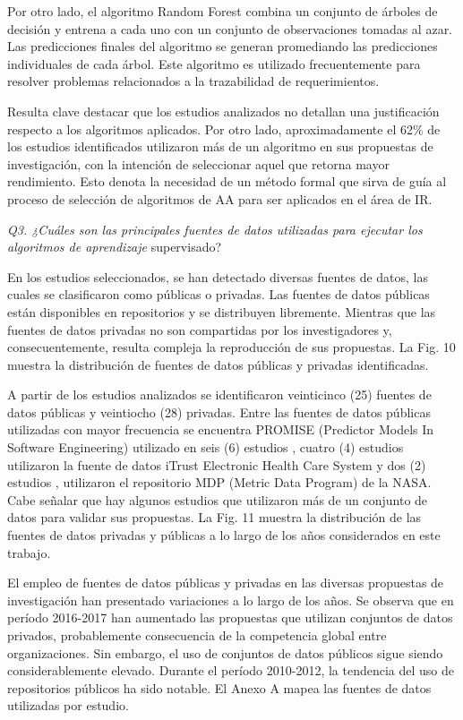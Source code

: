 \documentclass[journal]{IEEEtran}
\begin{document}
Por otro lado, el algoritmo Random Forest combina un conjunto de árboles de decisión y entrena a cada uno con un conjunto de observaciones tomadas al azar. Las predicciones finales del algoritmo se generan promediando las predicciones individuales de cada árbol. Este algoritmo es utilizado frecuentemente para resolver problemas relacionados a la trazabilidad de requerimientos. 

Resulta clave destacar que los estudios analizados no detallan una justificación respecto a los algoritmos aplicados. Por otro lado, aproximadamente el 62\% de los estudios identificados utilizaron más de un algoritmo en sus propuestas de investigación, con la intención de seleccionar aquel que retorna mayor rendimiento. Esto denota la necesidad de un método formal que sirva de guía al proceso de selección de algoritmos de AA para ser aplicados en el área de IR.

\emph{Q3. ¿Cuáles son las principales fuentes de datos utilizadas para ejecutar los algoritmos de aprendizaje} supervisado?

En los estudios seleccionados, se han detectado diversas fuentes de datos, las cuales se clasificaron como públicas o privadas. Las fuentes de datos públicas están disponibles en repositorios y se distribuyen libremente. Mientras que las fuentes de datos privadas no son compartidas por los investigadores y, consecuentemente, resulta compleja la reproducción de sus propuestas. La Fig. 10 muestra la distribución de fuentes de datos públicas y privadas identificadas.

A partir de los estudios analizados se identificaron veinticinco (25) fuentes de datos públicas y veintiocho (28) privadas. Entre las fuentes de datos públicas utilizadas con mayor frecuencia se encuentra PROMISE (Predictor Models In Software Engineering) utilizado en seis (6) estudios \cite{Jindal20162027,dekhtyar2017re,abad2017works,Slankas2013,fitzgerald2012early,malhotra2017exploratory}, cuatro (4) estudios utilizaron la fuente de datos iTrust Electronic Health Care System \cite{Slankas2013,Slankas2013a,winkler2016automatic,sharma2014automated} y dos (2) estudios \cite{fitzgerald2012early}, \cite{malhotra2017exploratory} utilizaron el repositorio MDP (Metric Data Program) de la NASA. Cabe señalar que hay algunos estudios que utilizaron más de un conjunto de datos para validar sus propuestas. La Fig. 11 muestra la distribución de las fuentes de datos privadas y públicas a lo largo de los años considerados en este trabajo.

El empleo de fuentes de datos públicas y privadas en las diversas propuestas de investigación han presentado variaciones a lo largo de los años. Se observa que en período 2016-2017 han aumentado las propuestas que utilizan conjuntos de datos privados, probablemente consecuencia de la competencia global entre organizaciones. Sin embargo, el uso de conjuntos de datos públicos sigue siendo considerablemente elevado. Durante el período 2010-2012, la tendencia del uso de repositorios públicos ha sido notable. El Anexo A mapea las fuentes de datos utilizadas por estudio.
\end{document}
